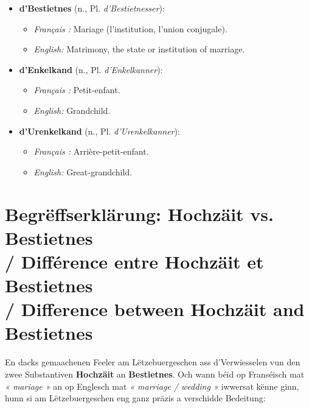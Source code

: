 \begin{itemize}
    \item \textbf{d'Bestietnes} (n., Pl. \textit{d'Bestietnesser}):
    \begin{itemize}
        \item \textit{Français :} Mariage (l'institution, l'union conjugale).
        \item \textit{English:} Matrimony, the state or institution of marriage.
    \end{itemize}

    \item \textbf{d'Enkelkand} (n., Pl. \textit{d'Enkelkanner}):
    \begin{itemize}
        \item \textit{Français :} Petit-enfant.
        \item \textit{English:} Grandchild.
    \end{itemize}

    \item \textbf{d'Urenkelkand} (n., Pl. \textit{d'Urenkelkanner}):
    \begin{itemize}
        \item \textit{Français :} Arrière-petit-enfant.
        \item \textit{English:} Great-grandchild.
    \end{itemize}
\end{itemize}

\vspace{1.5em}

\section[Hochzäit vs. Bestietnes / Hochzäit vs. Bestietnes]{Begrëffserklärung: Hochzäit vs. Bestietnes \\/ Différence entre Hochzäit et Bestietnes \\/ Difference between Hochzäit and Bestietnes}

\noindent En dacks gemaachenen Feeler am Lëtzebuergeschen ass d'Verwiesselen vun den zwee Substantiven \textbf{Hochzäit} an \textbf{Bestietnes}. Och wann béid op Franséisch mat \textit{« mariage »} an op Englesch mat \textit{« marriage / wedding »} iwwersat kënne ginn, hunn si am Lëtzebuergeschen eng ganz präzis a verschidde Bedeitung:

